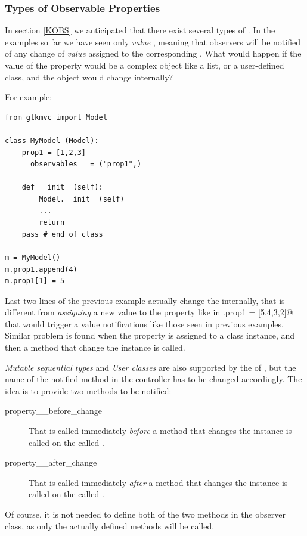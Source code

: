 \subsubsection{\label{KOBS:DET}Types of Observable Properties}

In section \ref{KOBS} we anticipated that there exist several types
of \OP. In the examples so far we have seen only \emph{value} \OPS,
meaning that observers will be notified of any change of \emph{value}
assigned to the corresponding \OP. What would happen if the value of
the property would be a complex object like a list, or a user-defined
class, and the object would change internally?

For example:

{ \codesize 
\begin{verbatim} 
from gtkmvc import Model

class MyModel (Model):
    prop1 = [1,2,3]
    __observables__ = ("prop1",)

    def __init__(self):
        Model.__init__(self)
        ...
        return
    pass # end of class

m = MyModel()
m.prop1.append(4)
m.prop1[1] = 5
\end{verbatim}
}

Last two lines of the previous example actually change the \OP
internally, that is different from \emph{assigning} a new value to the
property like in \verb@m.prop1 = [5,4,3,2]@ that would trigger a value
notifications like those seen in previous examples.  Similar problem
is found when the property is assigned to a class instance, and then a
method that change the instance is called.

\emph{Mutable sequential types} and \emph{User classes} are also
supported by the \obs of \pygtkmvc, but the name of the notified
method in the controller has to be changed accordingly.
The idea is to provide two methods to be notified:
\begin{description}
\item[property\_\_before\_change] That is called
  immediately \emph{before} a method that changes the instance is
  called on the \OP called .
\item[property\_\_after\_change] That is called
  immediately \emph{after} a method that changes the instance is
  called on the \OP called .
\end{description}

Of course, it is not needed to define both of the two methods in the
observer class, as only the actually defined methods will be called. 

